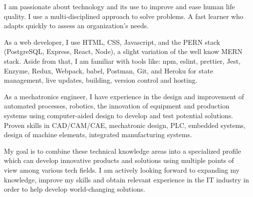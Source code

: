 \begin{bodyfont}

  I am passionate about technology and its use to improve and ease human life quality. I use a multi-disciplined approach to solve problems. A fast learner who adapts quickly to assess an organization’s needs.

  As a web developer, I use HTML, CSS, Javascript, and the PERN stack (PostgreSQL, Express, React, Node), a slight variation of the well know MERN stack. Aside from that, I am familiar with tools like: npm, eslint, prettier, Jest, Enzyme, Redux, Webpack, babel, Postman, Git, and Heroku for state management, live updates, building, version control and hosting.

  As a mechatronics engineer, I have experience in the design and improvement of automated processes, robotics, the innovation of equipment and production systems using computer-aided design to develop and test potential solutions. Proven skills in CAD/CAM/CAE, mechatronic design, PLC, embedded systems, design of machine elements, integrated manufacturing systems.
  
  My goal is to combine these technical knowledge areas into a specialized profile which can develop innovative products and solutions using multiple points of view among various tech fields. I am actively looking forward to expanding my knowledge, improve my skills and obtain relevant experience in the IT industry in order to help develop world-changing solutions.

\end{bodyfont}